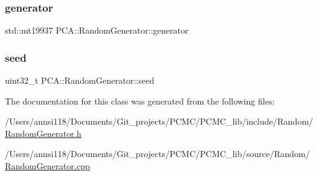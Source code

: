 \subsubsection{\texorpdfstring{generator}{generator}}
{\footnotesize\ttfamily std\+::mt19937 P\+C\+A\+::\+Random\+Generator\+::generator\hspace{0.3cm}{\ttfamily [static]}}

\hypertarget{class_p_c_a_1_1_random_generator_af96d99ba4eaf71b7d33afd2fbdb7c30d}{}\label{class_p_c_a_1_1_random_generator_af96d99ba4eaf71b7d33afd2fbdb7c30d} 
\subsubsection{\texorpdfstring{seed}{seed}}
{\footnotesize\ttfamily uint32\+\_\+t P\+C\+A\+::\+Random\+Generator\+::seed\hspace{0.3cm}{\ttfamily [static]}}



The documentation for this class was generated from the following files\+:\begin{DoxyCompactItemize}
\item 
/\+Users/annsi118/\+Documents/\+Git\+\_\+projects/\+P\+C\+M\+C/\+P\+C\+M\+C\+\_\+lib/include/\+Random/\hyperlink{_random_generator_8h}{Random\+Generator.\+h}\item 
/\+Users/annsi118/\+Documents/\+Git\+\_\+projects/\+P\+C\+M\+C/\+P\+C\+M\+C\+\_\+lib/source/\+Random/\hyperlink{_random_generator_8cpp}{Random\+Generator.\+cpp}\end{DoxyCompactItemize}
